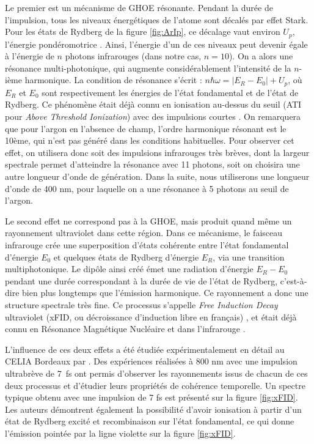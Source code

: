 Le premier est un mécanisme de GHOE résonante. Pendant la durée de l'impulsion, tous les niveaux énergétiques de l'atome sont décalés par effet Stark. Pour les états de Rydberg de la figure \ref{fig:ArIp}, ce décalage vaut environ $U_p$, l'énergie pondéromotrice . Ainsi, l'énergie d'un de ces niveaux peut devenir égale à l'énergie de $n$ photons infrarouges (dans notre cas, $n=10$). On a alors une résonance multi-photonique, qui augmente considérablement l'intensité de la $n$-ième harmonique. La condition de résonance s'écrit : $n\hbar\omega = |E_R-E_0|+U_p$, où $E_R$ et $E_0$ sont respectivement les énergies de l'état fondamental et de l'état de Rydberg. Ce phénomène était déjà connu en ionisation au-dessus du seuil (ATI pour \textit{Above Threshold Ionization}) avec des impulsions courtes . On remarquera que pour l'argon en l'absence de champ, l'ordre harmonique résonant est le 10ème, qui n'est pas généré dans les conditions habituelles. Pour observer cet effet, on utilisera donc soit des impulsions infrarouges très brèves, dont la largeur spectrale permet d'atteindre la résonance avec 11 photons, soit on choisira une autre longueur d'onde de génération. Dans la suite, nous utiliserons une longueur d'onde de 400 nm, pour laquelle on a une résonance à 5 photons au seuil de l'argon.

Le second effet ne correspond pas à la GHOE, mais produit quand même un rayonnement ultraviolet dans cette région. Dans ce mécanisme, le faisceau infrarouge crée une superposition d'états cohérente entre l'état fondamental d'énergie $E_0$ et quelques états de Rydberg d'énergie $E_R$, via une transition multiphotonique. Le dipôle ainsi créé émet une radiation d'énergie $E_R-E_0$ pendant une durée correspondant à la durée de vie de l'état de Rydberg, c'est-à-dire bien plus longtemps que l'émission harmonique. Ce rayonnement a donc une structure spectrale très fine. Ce processus s'appelle \textit{Free Induction Decay} ultraviolet (xFID, ou décroissance d'induction libre en français) , et était déjà connu en Résonance Magnétique Nucléaire  et dans l'infrarouge . 

L'influence de ces deux effets a été étudiée expérimentalement en détail au CELIA Bordeaux par . Des expériences réalisées à 800 nm avec une impulsion ultrabrève de 7~fs ont permis d'observer les rayonnements issus de chacun de ces deux processus et d'étudier leurs propriétés de cohérence temporelle. Un spectre typique obtenu avec une impulsion de 7 fs est présenté sur la figure \ref{fig:xFID}. Les auteurs démontrent également la possibilité d'avoir ionisation à partir d'un état de Rydberg excité et recombinaison sur l'état fondamental, ce qui donne l'émission pointée par la ligne violette sur la figure \ref{fig:xFID}. 

